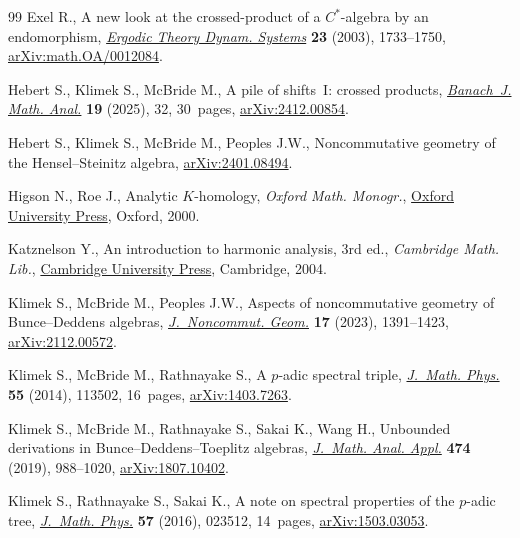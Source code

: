 \documentclass[pdftex]{sigma}
\numberwithin{equation}{section}
\begin{document}
\begin{thebibliography}{99}
Exel R., A new look at the crossed-product of a {$C^*$}-algebra by an
 endomorphism,
 \href{https://doi.org/10.1017/S0143385702001797}{\textit{Ergodic Theory
 Dynam. Systems}} \textbf{23} (2003), 1733--1750,
 \href{http://arxiv.org/abs/math.OA/0012084}{arXiv:math.OA/0012084}.

Hebert S., Klimek S., McBride M., A pile of shifts~{I}: crossed products,
 \href{https://doi.org/10.1007/s43037-025-00425-6}{\textit{Banach~J. Math.
 Anal.}} \textbf{19} (2025), 32, 30~pages,
 \href{http://arxiv.org/abs/2412.00854}{arXiv:2412.00854}.

Hebert S., Klimek S., McBride M., Peoples J.W., Noncommutative geometry of the
 {H}ensel--{S}teinitz algebra,
 \href{http://arxiv.org/abs/2401.08494}{arXiv:2401.08494}.

Higson N., Roe J., Analytic {$K$}-homology, \textit{Oxford Math. Monogr.},
 \href{https://doi.org/10.1093/oso/9780198511762.001.0001}{Oxford University
 Press}, Oxford, 2000.

Katznelson Y., An introduction to harmonic analysis, 3rd ed., \textit{Cambridge Math. Lib.}, \href{https://doi.org/10.1017/CBO9781139165372}{Cambridge University
 Press}, Cambridge, 2004.

Klimek S., McBride M., Peoples J.W., Aspects of noncommutative geometry of
 {B}unce--{D}eddens algebras,
 \href{https://doi.org/10.4171/jncg/521}{\textit{J.~Noncommut. Geom.}}
 \textbf{17} (2023), 1391--1423,
 \href{http://arxiv.org/abs/2112.00572}{arXiv:2112.00572}.

Klimek S., McBride M., Rathnayake S., A {$p$}-adic spectral triple,
 \href{https://doi.org/10.1063/1.4900923}{\textit{J.~Math. Phys.}} \textbf{55}
 (2014), 113502, 16~pages,
 \href{http://arxiv.org/abs/1403.7263}{arXiv:1403.7263}.

Klimek S., McBride M., Rathnayake S., Sakai K., Wang H., Unbounded derivations
 in {B}unce--{D}eddens--{T}oeplitz algebras,
 \href{https://doi.org/10.1016/j.jmaa.2019.02.001}{\textit{J.~Math. Anal.
 Appl.}} \textbf{474} (2019), 988--1020,
 \href{http://arxiv.org/abs/1807.10402}{arXiv:1807.10402}.

Klimek S., Rathnayake S., Sakai K., A note on spectral properties of the
 {$p$}-adic tree, \href{https://doi.org/10.1063/1.4940339}{\textit{J.~Math.
 Phys.}} \textbf{57} (2016), 023512, 14~pages,
 \href{http://arxiv.org/abs/1503.03053}{arXiv:1503.03053}.


\end{thebibliography}
\end{document}
